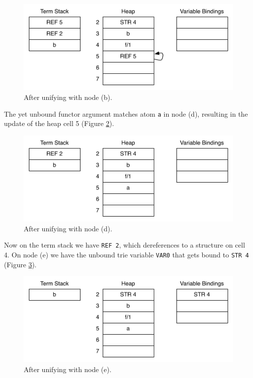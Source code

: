 \begin{figure}[H]
  \centering
    \includegraphics[scale=0.6]{collect_variable2.pdf}
  \caption{After unifying with node (b).}
  \label{fig:collect_variable2}
\end{figure}

The yet unbound functor argument matches atom \texttt{a} in node (d),
resulting in the update of the heap cell 5 (Figure \ref{fig:collect_variable3}).

\begin{figure}[H]
  \centering
    \includegraphics[scale=0.6]{collect_variable3.pdf}
  \caption{After unifying with node (d).}
  \label{fig:collect_variable3}
\end{figure}

Now on the term stack we have \texttt{REF 2}, which dereferences to
a structure on cell 4. On node (e) we have the unbound trie variable
\texttt{VAR0} that gets bound to \texttt{STR 4} (Figure \ref{fig:collect_variable4}).

\begin{figure}[H]
  \centering
    \includegraphics[scale=0.6]{collect_variable4.pdf}
  \caption{After unifying with node (e).}
  \label{fig:collect_variable4}
\end{figure}

